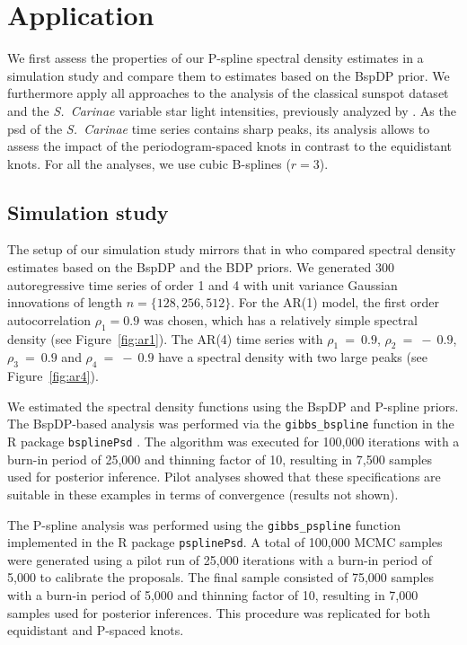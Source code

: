 \documentclass[twocolumn,final]{svjour3}
\begin{document}

\section{Application}
\label{sec:application}

We first assess the properties of our P-spline spectral density estimates in a simulation study and compare them to estimates based on the BspDP prior. We furthermore apply all approaches to the
analysis of the classical sunspot dataset  and the {\it S.\ Carinae} variable star light intensities, previously analyzed by \cite{Cart:1997,Huerta:1999,Kirch:2018}.  As the psd of the  {\it S.\ Carinae} time series contains sharp peaks, its analysis allows to assess the impact of the periodogram-spaced knots in contrast to the equidistant knots.   For all the analyses, we use cubic B-splines ($r=3$).

\subsection{Simulation study}

The setup of our simulation study mirrors that  in \cite{Edwards2018} who  compared spectral density estimates based on the BspDP and the BDP priors. 
We generated  300  autoregressive time series of order 1 and 4 with unit variance Gaussian innovations of length $n = \{128, 256, 512\}$.
For the AR(1) model, the  first  order autocorrelation $\rho_1 = 0.9$ was chosen, which has a relatively simple spectral density (see Figure~\ref{fig:ar1}).  The AR(4) time series with $\rho_1~=~0.9$, $\rho_2~=~-~0.9$, $\rho_3~=~0.9$ and $\rho_4~=~-~0.9$ have a spectral density with two large peaks (see Figure~\ref{fig:ar4}).  

We estimated the spectral density functions using the BspDP and P-spline priors.  The BspDP-based  analysis was performed via the \texttt{gibbs\_bspline} function in the \textsf{R} package \texttt{bsplinePsd} \cite{Edwards:bsplinePsd:2018}.  The algorithm was executed for 100,000 iterations with a burn-in period of 25,000 and thinning factor of 10, resulting in 7,500 samples used for posterior inference.  Pilot analyses showed that these specifications are suitable in these examples in terms of convergence (results not shown).  

The P-spline analysis was performed using the \texttt{gibbs\_pspline} function implemented in the \textsf{R} package \texttt{psplinePsd}.  A total of 100,000 MCMC samples were generated
using  a pilot run of 25,000 iterations with a burn-in period of 5,000 to calibrate the proposals.  The final sample consisted of 75,000 samples with a burn-in period of 5,000 and thinning factor of 10, resulting in 7,000 samples used for posterior inferences.  
This procedure was replicated for both equidistant and P-spaced knots. 
\end{document}
